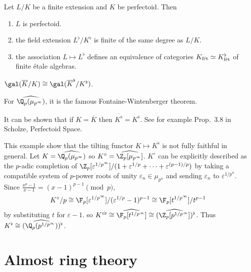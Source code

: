 \documentclass[a4paper]{article}
\newcommand{\tilt}{\flat} %
\begin{document}
\begin{theorem}
  Let \(L/K\) be a finite extension and \(K\) be perfectoid. Then
  \begin{enumerate}
  \item \(L\) is perfectoid.
  \item the field extension \(L^\tilt/K^\tilt\) is finite of the same degree as \(L/K\).
  \item the association \(L \mapsto L^\tilt\) defines an equivalence of categories \(K_{\textup{fét}} \simeq K^\tilt_{\textup{fét}}\) of finite étale algebras.
  \end{enumerate}
\end{theorem}

\begin{corollary}
  \(\gal(\overline K/K) \cong \gal(\overline K^\tilt/K^\tilt)\).
\end{corollary}

\begin{remark}
  For \(\widehat{\Q_p(\mu_{p^\infty})}\), it is the famous Fontaine-Wintenberger theorem.
\end{remark}

\begin{remark}
  It can be shown that if \(K = \overline K\) then \(\overline{K^\tilt} = K^\tilt\). See for example Prop.\ 3.8 in Scholze, Perfectoid Space.
\end{remark}

\begin{eg}
  This example show that the tilting functor \(K \mapsto K^\tilt\) is not fully faithful in general. Let \(K = \widehat{\Q_p(\mu_{p^\infty})}\) so \(K^\circ = \widehat{\Z_p[\mu_{p^\infty}]}\). \(K^\circ\) can be explicitly described as the \(p\)-adic completion of \(\Z_p[\varepsilon^{1/p^\infty}]/(1 + \varepsilon^{1/p} + \dots + \varepsilon^{(p - 1)/p})\) by taking a compatible system of \(p\)-power roots of unity \(\varepsilon_n \in \mu_{p^n}\) and sending \(\varepsilon_n\) to \(\varepsilon^{1/p^n}\). Since \(\frac{x^p - 1}{x - 1} = (x - 1)^{p - 1} \pmod p\),
  \[
    K^\circ/p \cong \F_p[\varepsilon^{1/p^\infty}]/(\varepsilon^{1/p} - 1)^{p - 1} \cong \F_p[t^{1/p^\infty}]/t^{p - 1}
  \]
  by substituting \(t\) for \(\varepsilon - 1\). so \(K^{\circ \tilt} \cong \widehat{\F_p[t^{1/p^\infty}]} \cong (\widehat{\Z_p[p^{1/p^\infty}]})^\tilt\). Thus \(K^\tilt \cong (\widehat{\Q_p(p^{1/p^\infty})})^\tilt\).
\end{eg}

\section{Almost ring theory}
\end{document}
